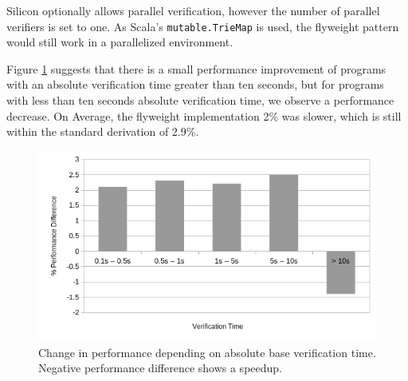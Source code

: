\documentclass[11pt]{article}
\begin{document}
    Silicon optionally
    allows parallel verification, however the number of parallel 
    verifiers is set to one. As Scala's \texttt{mutable.TrieMap} is used,
    the flyweight pattern would still work in a parallelized environment.
    
    Figure \ref{fig:absolute-verification-time-part-1} suggests that there is a small
    performance improvement of programs with an absolute verification time greater than
    ten seconds, but for programs with less than ten seconds absolute verification time,
    we observe a performance decrease.
    On Average, the flyweight implementation 2\% was slower,
    which is still within the standard derivation of 2.9\%.

    \begin{figure}[H]
        \includegraphics[width=\linewidth]{performance-change-vs-verification-time-part-1.png}
        \caption{
            Change in performance depending on absolute base verification time. Negative performance difference shows a speedup.
        }
        \label{fig:absolute-verification-time-part-1}
    \end{figure}



\end{document}
